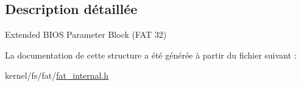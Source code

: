 \subsection{\-Description détaillée}
\-Extended \-B\-I\-O\-S \-Parameter \-Block (\-F\-A\-T 32) 

\-La documentation de cette structure a été générée à partir du fichier suivant \-:\begin{DoxyCompactItemize}
\item 
kernel/fs/fat/\hyperlink{fat__internal_8h}{fat\-\_\-internal.\-h}\end{DoxyCompactItemize}
